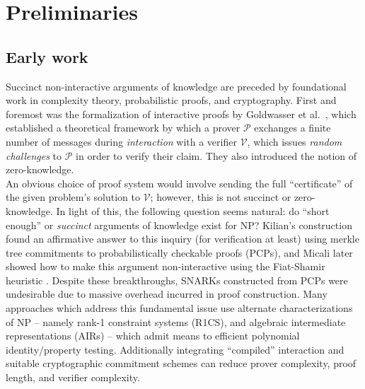 \section{Preliminaries}
\subsection{Early work}
\noindent Succinct non-interactive arguments of knowledge are preceded by foundational work in complexity theory, probabilistic proofs, and cryptography. First and foremost was the formalization of interactive proofs by Goldwasser et al.\ \cite{ipfirst}, which established a theoretical framework by which a prover $\mathcal{P}$ exchanges a finite number of messages during \textit{interaction} with a verifier $\mathcal{V}$, which issues \textit{random challenges} to $\mathcal{P}$ in order to verify their claim. They also introduced the notion of zero-knowledge.\\ 

\noindent An obvious choice of proof system would involve sending the full ``certificate'' of the given problem's solution to $\mathcal{V}$; however, this is not succinct or zero-knowledge. In light of this, the following question seems natural: do ``short enough'' or \textit{succinct} arguments of knowledge exist for NP? Kilian's construction \cite{kilian} found an affirmative answer to this inquiry (for verification at least) using merkle tree commitments to probabilistically checkable proofs (PCPs), and Micali later showed how to make this argument non-interactive \cite{micalisnark} using the Fiat-Shamir heuristic \cite{fiatshamir}. Despite these breakthroughs, SNARKs constructed from PCPs were undesirable due to massive overhead incurred in proof construction. Many approaches which address this fundamental issue use alternate characterizations of NP -- namely rank-1 constraint systems (R1CS), and algebraic intermediate representations (AIRs) -- which admit means to efficient polynomial identity/property testing. Additionally integrating ``compiled'' interaction and suitable cryptographic commitment schemes can reduce prover complexity, proof length, and verifier complexity.\\

